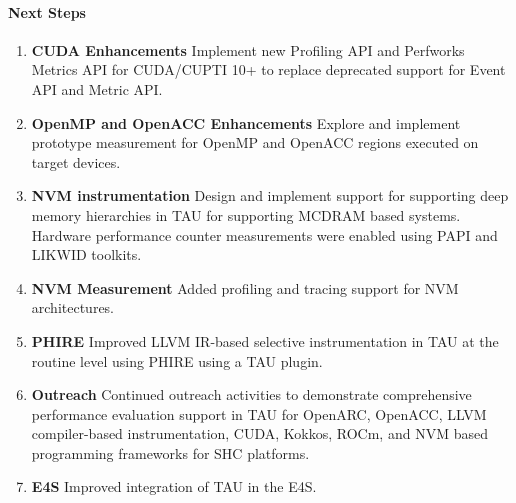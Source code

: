 \paragraph{Next Steps}
\begin{enumerate}
\item \textbf{CUDA Enhancements} 
Implement new Profiling API and Perfworks Metrics API for CUDA/CUPTI 10+ to replace deprecated support for Event API and Metric API.

\item \textbf{OpenMP and OpenACC Enhancements} 
Explore and implement prototype measurement for OpenMP and OpenACC regions executed on target devices.

\item \textbf{NVM instrumentation} 
Design and implement support for supporting deep memory hierarchies in TAU for supporting MCDRAM based systems. Hardware performance counter measurements were enabled using PAPI and LIKWID toolkits.

\item \textbf{NVM Measurement} 
Added profiling and tracing support for NVM architectures.

\item \textbf{PHIRE} 
Improved LLVM IR-based selective instrumentation in TAU at the routine level using PHIRE using a TAU plugin.

\item \textbf{Outreach}
Continued outreach activities to demonstrate comprehensive performance evaluation support in TAU for OpenARC, OpenACC, LLVM compiler-based instrumentation, CUDA, Kokkos, ROCm, and NVM based programming frameworks for SHC platforms. 

\item \textbf{E4S} 
Improved integration of TAU in the E4S. 

\end{enumerate}
